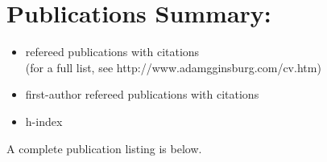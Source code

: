 \begin{minipage}{\textwidth}
\setlength{\extrarowheight}{0pt}
\section*{Publications Summary: }
\vspace{-12pt}
\begin{itemize}
\itemsep-3pt
\item \nrefereed refereed publications with \ncites citations\\
{\normalsize(for a full list, see http://www.adamgginsburg.com/cv.htm)}
\item \nfirst first-author refereed publications with \ncitesfirst citations
\item h-index \hindex

\end{itemize}

A complete publication listing is below.

\end{minipage}
\vspace{4mm}
